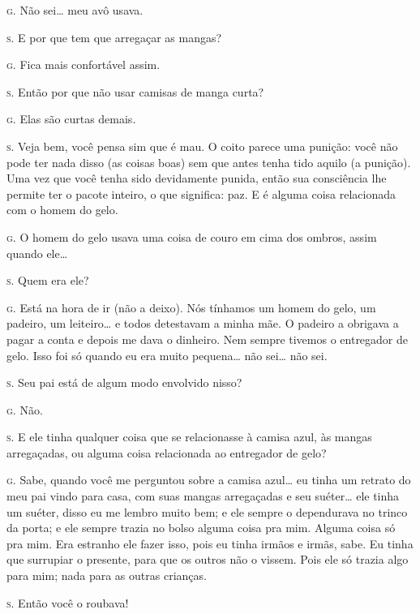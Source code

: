 \noindent\hskip0mm\textsc{g.} Não sei\ldots{} meu avô usava.

\noindent\hskip0mm\textsc{s.} E por que tem que arregaçar as mangas?

\noindent\hskip0mm\textsc{g.} Fica mais confortável assim.

\noindent\hskip0mm\textsc{s.} Então por que não usar camisas de manga curta?

\noindent\hskip0mm\textsc{g.} Elas são curtas demais.

\noindent\hskip0mm\textsc{s.} Veja bem, você pensa sim que é mau. O coito parece uma punição: você
não pode ter nada disso (as coisas boas) sem que antes tenha tido
aquilo (a punição). Uma vez que você tenha sido devidamente punida,
então sua consciência lhe permite ter o pacote inteiro, o que
significa: paz. E é alguma coisa relacionada com o homem do gelo.

\noindent\hskip0mm\textsc{g.} O homem do gelo usava uma coisa de couro em cima dos ombros, assim
quando ele\ldots{}

\noindent\hskip0mm\textsc{s.} Quem era ele?

\noindent\hskip0mm\textsc{g.} Está na hora de ir (não a deixo). Nós tínhamos um homem do gelo, um
padeiro, um leiteiro\ldots{} e todos detestavam a minha mãe. O padeiro a
obrigava a pagar a conta e depois me dava o dinheiro. Nem sempre
tivemos o entregador de gelo. Isso foi só quando eu era muito
pequena\ldots{} não sei\ldots{} não sei.

\noindent\hskip0mm\textsc{s.} Seu pai está de algum modo envolvido nisso?

\noindent\hskip0mm\textsc{g.} Não.

\noindent\hskip0mm\textsc{s.} E ele tinha qualquer coisa que se relacionasse à camisa azul, às
mangas arregaçadas, ou alguma coisa relacionada ao entregador de gelo?

\noindent\hskip0mm\textsc{g.} Sabe, quando você me perguntou sobre a camisa azul\ldots{} eu tinha um
retrato do meu pai vindo para casa, com suas mangas arregaçadas e seu
suéter\ldots{} ele tinha um suéter, disso eu me lembro muito bem; e ele
sempre o dependurava no trinco da porta; e ele sempre trazia no bolso
alguma coisa pra mim. Alguma coisa só pra mim. Era estranho ele fazer
isso, pois eu tinha irmãos e irmãs, sabe. Eu tinha que surrupiar o
presente, para que os outros não o vissem. Pois ele só trazia algo para
mim; nada para as outras crianças.

\noindent\hskip0mm\textsc{s.} Então você o roubava!

